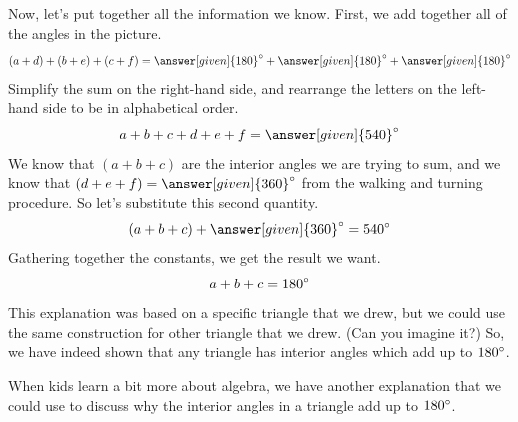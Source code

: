\documentclass{ximera}
\begin{document}
\begin{explanation}
Now, let's put together all the information we know. First, we add together all of the angles in the picture.
\[
(a+d) + (b+e) + (c+f) = \answer[given]{180}\degree + \answer[given]{180}\degree + \answer[given]{180}\degree
\]
Simplify the sum on the right-hand side, and rearrange the letters on the left-hand side to be in alphabetical order.
\[
a + b + c + d + e + f = \answer[given]{540}\degree
\]
We know that $(a + b + c)$ are the interior angles we are trying to sum, and we know that $(d + e + f) = \answer[given]{360}\degree$ from the walking and turning procedure. So let's substitute this second quantity.
\[
(a + b + c) + \answer[given]{360}\degree = 540\degree
\]
Gathering together the constants, we get the result we want.
\[
a + b + c = 180\degree
\]
This explanation was based on a specific triangle that we drew, but we could use the same construction for  other triangle that we drew. (Can you imagine it?) So, we have indeed shown that any triangle has interior angles which add up to $180\degree$.
\end{explanation}

When kids learn a bit more about algebra, we have another explanation that we could use to discuss why the interior angles in a triangle add up to $180\degree$.
\end{document}
